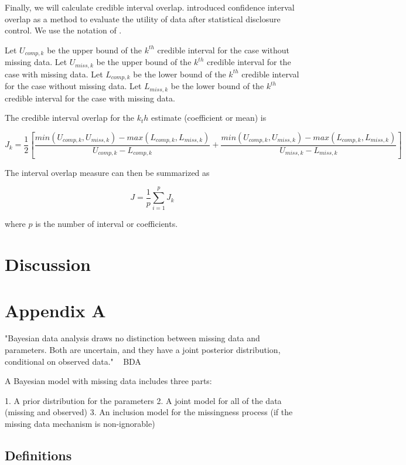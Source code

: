 \documentclass[11pt]{article}
\begin{document}
Finally, we will calculate credible interval overlap. \cite{Karr2006} introduced confidence interval overlap as a method to evaluate the utility of data after statistical disclosure control. We use the notation of \cite{Snoke2018}.

Let $U_{comp,k}$ be the upper bound of the $k^{th}$ credible interval for the case without missing data. Let $U_{miss,k}$ be the upper bound of the $k^{th}$ credible interval for the case with missing data. Let $L_{comp,k}$ be the lower bound of the $k^{th}$ credible interval for the case without missing data. Let $L_{miss,k}$ be the lower bound of the $k^{th}$ credible interval for the case with missing data. 

The credible interval overlap for the $k_th$ estimate (coefficient or mean) is 

$$J_k = \frac{1}{2}\left[\frac{min(U_{comp,k}, U_{miss,k}) - max(L_{comp,k}, L_{miss,k})}{U_{comp,k} - L_{comp,k}} + \frac{min(U_{comp,k}, U_{miss,k}) - max(L_{comp,k}, L_{miss,k})}{U_{miss,k} - L_{miss,k}}\right]$$

The interval overlap measure can then be summarized as 

$$J = \frac{1}{p}\sum_{i = 1}^pJ_k$$

where $p$ is the number of interval or coefficients. 

\section{Discussion}

\newpage
\section{Appendix A}

"Bayesian data analysis draws no distinction between missing data and parameters. Both are uncertain, and they have a joint posterior distribution, conditional on observed data." ~ BDA

A Bayesian model with missing data includes three parts:

1. A prior distribution for the parameters
2. A joint model for all of the data (missing and observed)
3. An inclusion model for the missingness process (if the missing data mechanism is non-ignorable)

\subsection{Definitions}
\end{document}

